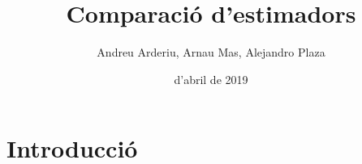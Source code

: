 \documentclass[12pt, catalan]{article}
\title{\sffamily {\bfseries Entrega 2:} Comparació d'estimadors}
\author{\sffamily Andreu Arderiu, Arnau Mas, Alejandro Plaza}
\date{\sffamily 25 d'abril de 2019}
\begin{document}
\maketitle

\section{Introducció}
\end{document}
